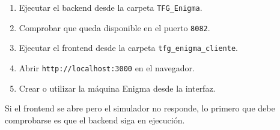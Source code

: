 \begin{enumerate}
	\item Ejecutar el backend desde la carpeta \texttt{TFG\_Enigma}.
	\item Comprobar que queda disponible en el puerto \texttt{8082}.
	\item Ejecutar el frontend desde la carpeta \texttt{tfg\_enigma\_cliente}.
	\item Abrir \texttt{http://localhost:3000} en el navegador.
	\item Crear o utilizar la máquina Enigma desde la interfaz.
\end{enumerate}

Si el frontend se abre pero el simulador no responde, lo primero que debe comprobarse es que el backend siga en ejecución.
